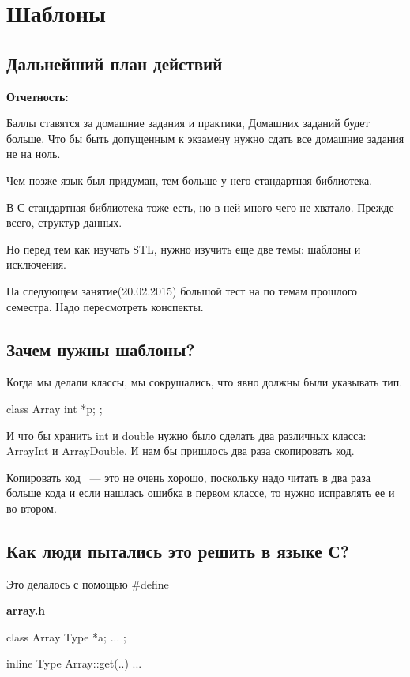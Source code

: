 \section{Шаблоны}
\subsection{Дальнейший план действий}

{\bf Отчетность:}

Баллы ставятся за домашние задания и практики, Домашних заданий будет больше. Что бы быть допущенным к экзамену нужно сдать все домашние задания не на ноль. 


Чем позже язык был придуман, тем больше у него стандартная библиотека. 

В С стандартная библиотека тоже есть, но в ней много чего не хватало. Прежде всего, структур данных. 

Но перед  тем как изучать STL, нужно изучить еще две темы: шаблоны и исключения. 

На следующем занятие(20.02.2015) большой тест на по темам прошлого семестра. Надо пересмотреть конспекты. 


\subsection{Зачем нужны шаблоны?}
Когда мы делали классы, мы сокрушались, что явно должны были указывать тип. 

\begin{cppcode}
class Array{
     int *p;
};
\end{cppcode}

И что бы хранить int и double нужно было сделать два различных класса: ArrayInt и ArrayDouble. 
И нам бы пришлось два раза скопировать код. 

Копировать код ~--- это не очень хорошо, поскольку надо читать в два раза больше кода и если нашлась ошибка в первом классе, то нужно исправлять ее и во втором.

\subsection{Как люди пытались это решить в языке С?}

Это делалось с помощью \#define

{\bf array.h}

\begin{cppcode}
class Array{
Type *a;
...
};

inline Type Array::get(..){  
...
}
\end{cppcode}

